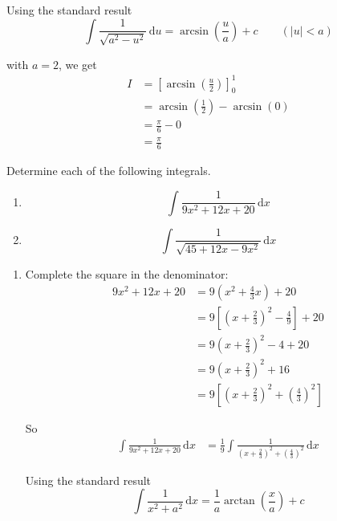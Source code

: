 \documentclass[leqno]{article}
\begin{document}
\begin{enumerate}[
  label=\textbf{\arabic*.},
  leftmargin=*,
  topsep=0pt,
  partopsep=0pt,
  parsep=0pt
]
\begin{djsSolution}
Using the standard result
\[
\int \frac{1}{\sqrt{a^2-u^2}}\,\mathrm{d}u=\arcsin\left(\frac{u}{a}\right)+c\qquad (|u|<a)
\]

with \(a=2\), we get
\begin{align*}
I
&=\left[\arcsin\left(\frac{u}{2}\right)\right]_0^1 \\
&=\arcsin\left(\frac{1}{2}\right)-\arcsin(0) \\
&=\frac{\pi}{6}-0 \\
&=\frac{\pi}{6}
\end{align*}
\end{djsSolution}


\newpage

\questionitem

Determine each of the following integrals. \\
\begin{enumerate}[label=(\roman*)]
  \item
  \[
  \int \frac{1}{9x^2+12x+20}\,\mathrm{d}x
  \]
  \item
  \[
  \int \frac{1}{\sqrt{45+12x-9x^2}}\,\mathrm{d}x
  \]
\end{enumerate}

\vspace*{10pt}

\begin{djsSolution}
\begin{enumerate}[label=\textbf{(\roman*)}]
\item Complete the square in the denominator:
\begin{align*}
9x^2+12x+20
&=9\left(x^2+\frac{4}{3}x\right)+20 \\
&=9\left[\left(x+\frac23\right)^2-\frac49\right]+20 \\
&=9\left(x+\frac23\right)^2-4+20 \\
&=9\left(x+\frac23\right)^2+16 \\
&=9\left[\left(x+\frac23\right)^2+\left(\frac43\right)^2\right]
\end{align*}

So
\begin{align*}
\int \frac{1}{9x^2+12x+20}\,\mathrm{d}x
&=\frac19\int \frac{1}{\left(x+\frac23\right)^2+\left(\frac43\right)^2}\,\mathrm{d}x
\end{align*}

Using the standard result
\[
\int \frac{1}{x^2+a^2}\,\mathrm{d}x
=
\frac{1}{a}\arctan\left(\frac{x}{a}\right)+c
\]


\end{enumerate}
\end{djsSolution}
\end{enumerate}
\end{document}

